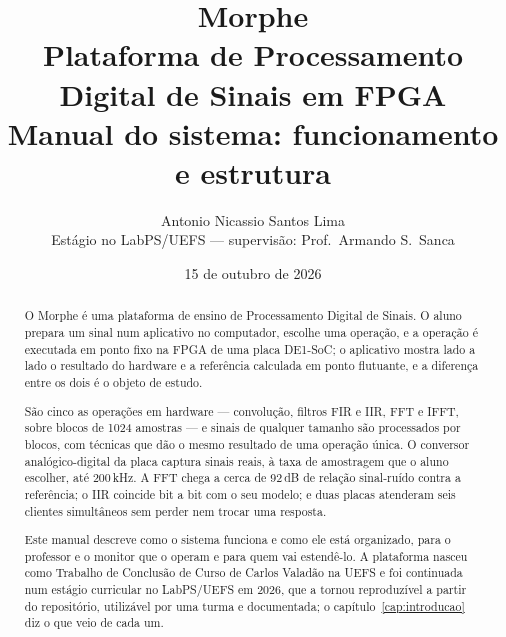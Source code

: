 \documentclass[11pt,a4paper,oneside]{report}
\title{\textbf{Morphe}\\[4pt]
  \large Plataforma de Processamento Digital de Sinais em FPGA\\
  Manual do sistema: funcionamento e estrutura}
\author{Antonio Nicassio Santos Lima\\
  \small Estágio no LabPS/UEFS --- supervisão: Prof.\ Armando S.\ Sanca}
\date{15 de outubro de 2026}
\begin{document}
\maketitle

\begin{abstract}
O Morphe é uma plataforma de ensino de Processamento Digital de Sinais. O aluno
prepara um sinal num aplicativo no computador, escolhe uma operação, e a
operação é executada em ponto fixo na FPGA de uma placa DE1-SoC; o aplicativo
mostra lado a lado o resultado do hardware e a referência calculada em ponto
flutuante, e a diferença entre os dois é o objeto de estudo.

São cinco as operações em hardware --- convolução, filtros FIR e IIR, FFT e
IFFT, sobre blocos de 1024 amostras --- e sinais de qualquer tamanho são
processados por blocos, com técnicas que dão o mesmo resultado de uma operação
única. O conversor analógico-digital da placa captura sinais reais, à taxa de
amostragem que o aluno escolher, até 200\,kHz. A FFT chega a cerca de 92\,dB de relação sinal-ruído
contra a referência; o IIR coincide bit a bit com o seu modelo; e duas placas
atenderam seis clientes simultâneos sem perder nem trocar uma resposta.

Este manual descreve como o sistema funciona e como ele está organizado, para
o professor e o monitor que o operam e para quem vai estendê-lo. A plataforma
nasceu como Trabalho de Conclusão de Curso de Carlos Valadão na UEFS e foi
continuada num estágio curricular no LabPS/UEFS em 2026, que a tornou
reproduzível a partir do repositório, utilizável por uma turma e documentada;
o capítulo~\ref{cap:introducao} diz o que veio de cada um.
\end{abstract}

\tableofcontents
\listoffigures
\listoftables













\appendix

\end{document}
